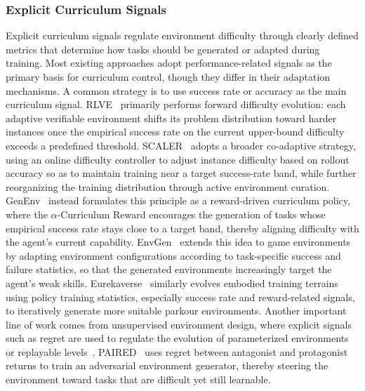 \documentclass{llmxive}
\begin{document}
\subsubsection{Explicit Curriculum Signals}\label{sec:Explicit Curriculum Signals}
Explicit curriculum signals regulate environment difficulty through clearly defined metrics that determine how tasks should be generated or adapted during training. 
%
Most existing approaches adopt performance-related signals as the primary basis for curriculum control, though they differ in their adaptation mechanisms.
%
A common strategy is to use success rate or accuracy as the main curriculum signal.
RLVE~\cite{RLVE} primarily performs forward difficulty evolution: each adaptive verifiable environment shifts its problem distribution toward harder instances once the empirical success rate on the current upper-bound difficulty exceeds a predefined threshold. 
SCALER~\cite{SCALER} adopts a broader co-adaptive strategy, using an online difficulty controller to adjust instance difficulty based on rollout accuracy so as to maintain training near a target success-rate band, while further reorganizing the training distribution through active environment curation. 
GenEnv~\cite{GenEnv} instead formulates this principle as a reward-driven curriculum policy, where the $\alpha$-Curriculum Reward encourages the generation of tasks whose empirical success rate stays close to a target band, thereby aligning difficulty with the agent's current capability.
EnvGen~\cite{EnvGen} extends this idea to game environments by adapting environment configurations according to task-specific success and failure statistics, so that the generated environments increasingly target the agent's weak skills.
Eurekaverse~\cite{Eurekaverse} similarly evolves embodied training terrains using policy training statistics, especially success rate and reward-related signals, to iteratively generate more suitable parkour environments.
%
Another important line of work comes from unsupervised environment design, where explicit signals such as regret are used to regulate the evolution of parameterized environments or replayable levels~\cite{PAIRED,DCD,MAESTRO,ACCEL,ReMiDi}.
PAIRED~\cite{PAIRED} uses regret between antagonist and protagonist returns to train an adversarial environment generator, thereby steering the environment toward tasks that are difficult yet still learnable.
\end{document}
